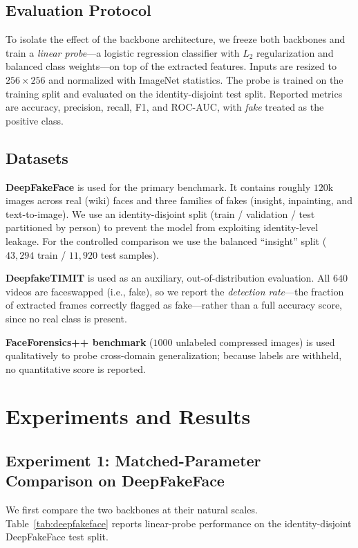 \documentclass[11pt,a4paper]{article}
\begin{document}
\subsection{Evaluation Protocol}
To isolate the effect of the backbone architecture, we freeze both backbones and train a
\emph{linear probe}---a logistic regression classifier with $L_2$ regularization and balanced
class weights---on top of the extracted features. Inputs are resized to $256\times256$ and
normalized with ImageNet statistics. The probe is trained on the training split and evaluated on
the identity-disjoint test split. Reported metrics are accuracy, precision, recall, F1, and
ROC-AUC, with \emph{fake} treated as the positive class.

\subsection{Datasets}
\textbf{DeepFakeFace} is used for the primary benchmark. It contains roughly $120$k images across
real (wiki) faces and three families of fakes (insight, inpainting, and text-to-image). We use an
identity-disjoint split (train / validation / test partitioned by person) to prevent the model
from exploiting identity-level leakage. For the controlled comparison we use the balanced
``insight'' split ($43{,}294$ train / $11{,}920$ test samples).

\textbf{DeepfakeTIMIT} is used as an auxiliary, out-of-distribution evaluation. All $640$ videos
are faceswapped (i.e., fake), so we report the \emph{detection rate}---the fraction of extracted
frames correctly flagged as fake---rather than a full accuracy score, since no real class is
present.

\textbf{FaceForensics++ benchmark} ($1000$ unlabeled compressed images) is used qualitatively to
probe cross-domain generalization; because labels are withheld, no quantitative score is reported.

\section{Experiments and Results}

\subsection{Experiment 1: Matched-Parameter Comparison on DeepFakeFace}
We first compare the two backbones at their natural scales. Table~\ref{tab:deepfakeface}
reports linear-probe performance on the identity-disjoint DeepFakeFace test split.
\end{document}
